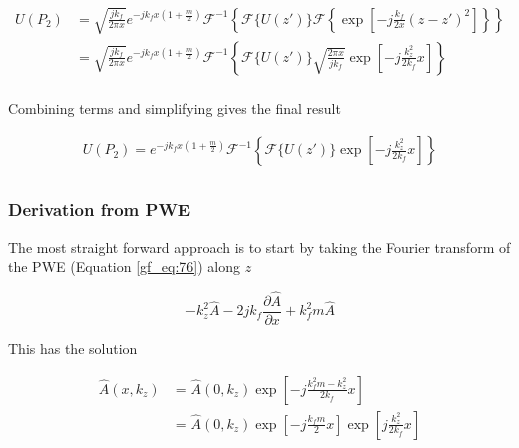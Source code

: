 \begin{equation}
\begin{aligned}
U(P_2) &=\sqrt{\frac{jk_f}{2\pi x}}e^{-jk_fx\left(1+\frac{m}{2}\right)}\mathcal{F}^{-1}\left\{\mathcal{F}\{U(z')\}\mathcal{F}\left\{ \exp\left[-j \frac{k_f}{2x}\left(z-z'\right)^2 \right]\right\} \right\} \\
&=\sqrt{\frac{jk_f}{2\pi x}}e^{-jk_fx\left(1+\frac{m}{2}\right)}\mathcal{F}^{-1}\left\{\mathcal{F}\{U(z')\}\sqrt{\frac{2\pi x}{jk_f}}\exp\left[-j\frac{k_z^2}{2k_f}x \right] \right\} \\
\label{gf_eq:302}
\end{aligned}
\end{equation}
\renewcommand{\baselinestretch}{2} \small\normalsize

\noindent Combining terms and simplifying gives the final result

\begin{equation}
\begin{aligned}
U(P_2) = e^{-jk_fx\left(1+\frac{m}{2}\right)}\mathcal{F}^{-1}\left\{\mathcal{F}\{U(z')\}\exp\left[-j\frac{k_z^2}{2k_f}x \right] \right\} \\
\label{gf_eq:303}
\end{aligned}
\end{equation}
\renewcommand{\baselinestretch}{2} \small\normalsize


\subsubsection{Derivation from PWE}
\noindent The most straight forward approach is to start by taking the Fourier transform of the PWE (Equation \ref{gf_eq:76}) along $z$

\begin{equation}
-k_z^2\hat{A} -2jk_f\frac{\partial \hat{A}}{\partial x} +k_f^2m\hat{A}
\label{gf_eq:77}
\end{equation}
\renewcommand{\baselinestretch}{2} \small\normalsize

\noindent This has the solution

\begin{equation}
\begin{aligned}
\hat{A}(x,k_z) &= \hat{A}(0,k_z)\exp\left[-j\frac{k_f^2m-k_z^2}{2k_f}x \right] \\
&= \hat{A}(0,k_z)\exp\left[-j\frac{k_fm}{2}x\right]\exp\left[j\frac{k_z^2}{2k_f}x \right]
\end{aligned}
\label{gf_eq:78}
\end{equation}
\renewcommand{\baselinestretch}{2} \small\normalsize

